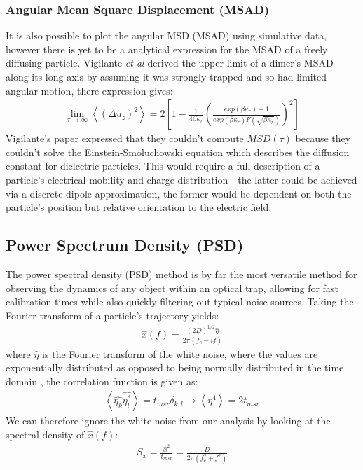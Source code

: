 \documentclass[a4paper,oneside,11pt]{book}
\begin{document}
\subsubsection{Angular Mean Square Displacement (MSAD)}
It is also possible to plot the angular MSD (MSAD) using simulative data, however there is yet to be a analytical expression for the MSAD of a freely diffusing particle. Vigilante \textit{et al} \cite{Vigilante2020} derived the upper limit of a dimer's MSAD along its long axis by assuming it was strongly trapped and so had limited angular motion, there expression gives:
\begin{align}
	\lim_{\tau\to\infty}\left<(\Delta u_z)^2\right> = 
	2\left[1-\frac{1}{4\beta\kappa_r} 
	\left(\frac{exp(\beta\kappa_r)-1}
	{exp(\beta\kappa_r)F(\sqrt{\beta\kappa_r})
	}\right)^2\right]
\end{align}  
Vigilante's paper expressed that they couldn't compute $MSD(\tau)$ because they couldn't solve the Einstein-Smoluchowski equation which describes the diffusion constant for dielectric particles. This would require a full description of a particle's electrical mobility and charge distribution - the latter could be achieved via a discrete dipole approximation, the former would be dependent on both the particle's position but relative orientation to the electric field.

\subsection{Power Spectrum Density (PSD)}
The power spectral density (PSD) method is by far the most versatile method for observing the dynamics of any object within an optical trap, allowing for fast calibration times while also quickly filtering out typical noise sources. Taking the Fourier transform of a particle's trajectory yields:
\begin{align}
	\hat{x}(f) = \frac{(2D)^{1/2}\hat{\eta}}{2\pi(f_c-if)}
\end{align}
where $\hat{\eta}$ is the Fourier transform of the white noise, where the values are exponentially distributed as opposed to being normally distributed in the time domain \cite{BergSoerensen2004}, the correlation function is given as:
\begin{align}
	\left<\hat{\eta_k}\hat{\eta_l^*}\right> = t_{msr} \delta_{k,l} \rightarrow \left< \eta^4 \right> = 2t_{msr}
\end{align} 
We can therefore ignore the white noise from our analysis by looking at the spectral density of $\hat{x}(f)$: 
\begin{align}
	S_x = \frac{\hat{x}^2}{t_{msr}} = \frac{D}{2\pi(f_c^2+f^2)}
\end{align}
\end{document}
